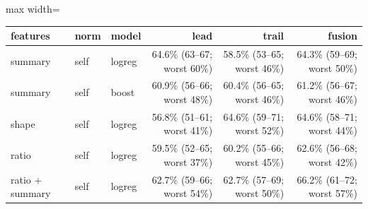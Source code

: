 \begin{adjustbox}{max width=\textwidth}
{\footnotesize
\begin{tabular}{lllrrr}
\toprule
\textbf{features} & \textbf{norm} & \textbf{model} & \textbf{lead} & \textbf{trail} & \textbf{fusion} \\
\midrule
summary & self & logreg & 64.6\% (63--67; worst 60\%) & 58.5\% (53--65; worst 46\%) & 64.3\% (59--69; worst 50\%) \\
summary & self & boost & 60.9\% (56--66; worst 48\%) & 60.4\% (56--65; worst 46\%) & 61.2\% (56--67; worst 46\%) \\
shape & self & logreg & 56.8\% (51--61; worst 41\%) & 64.6\% (59--71; worst 52\%) & 64.6\% (58--71; worst 44\%) \\
ratio & self & logreg & 59.5\% (52--65; worst 37\%) & 60.2\% (55--66; worst 45\%) & 62.6\% (56--68; worst 42\%) \\
ratio + summary & self & logreg & 62.7\% (59--66; worst 54\%) & 62.7\% (57--69; worst 50\%) & 66.2\% (61--72; worst 57\%) \\
\bottomrule
\end{tabular}
}
\end{adjustbox}
